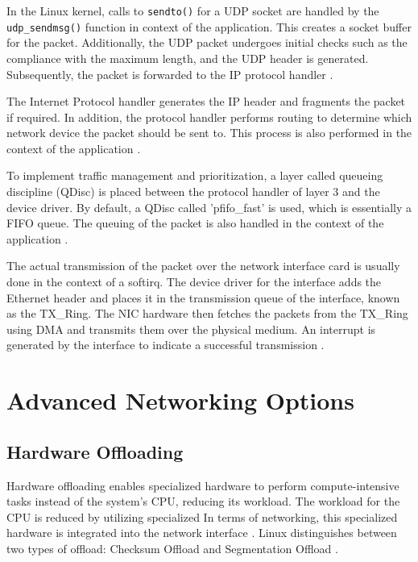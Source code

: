 In the Linux kernel, calls to \texttt{sendto()} for a UDP socket are handled by the \texttt{udp\_sendmsg()} function in context of the application. This creates a socket buffer for the packet. Additionally, the UDP packet undergoes initial checks such as the compliance with the maximum length, and the UDP header is generated. Subsequently, the packet is forwarded to the IP protocol handler \cite{lins01}.

The Internet Protocol handler generates the IP header and fragments the packet if required. In addition, the protocol handler performs routing to determine which network device the packet should be sent to. This process is also performed in the context of the application \cite{lins01, lins03}.

To implement traffic management and prioritization, a layer called queueing discipline (QDisc) is placed between the protocol handler of layer 3 and the device driver. By default, a QDisc called 'pfifo\_fast' is used, which is essentially a FIFO queue. The queuing of the packet is also handled in the context of the application \cite{lins03, lins12}.

The actual transmission of the packet over the network interface card is usually done in the context of a softirq. The device driver for the interface adds the Ethernet header and places it in the transmission queue of the interface, known as the TX\_Ring. The NIC hardware then fetches the packets from the TX\_Ring using DMA and transmits them over the physical medium. An interrupt is generated by the interface to indicate a successful transmission \cite{lins06, lins14}.




\section{Advanced Networking Options}

\subsection{Hardware Offloading} \label{chap:HWOffload}
Hardware offloading enables specialized hardware to perform compute-intensive tasks instead of the system's CPU, reducing its workload. The workload for the CPU is reduced by utilizing specialized In terms of networking, this specialized hardware is integrated into the network interface \cite{tuning01}. Linux distinguishes between two types of offload: Checksum Offload and Segmentation Offload \cite{tuning02, tuning03}.

